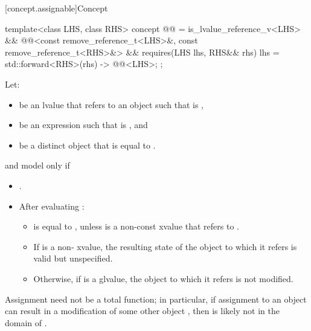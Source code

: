 [concept.assignable]{Concept }

\begin{itemdecl}
template<class LHS, class RHS>
  concept @@ =
    is_lvalue_reference_v<LHS> &&
    @@<const remove_reference_t<LHS>&, const remove_reference_t<RHS>&> &&
    requires(LHS lhs, RHS&& rhs) {
      { lhs = std::forward<RHS>(rhs) } -> @@<LHS>;
    };
\end{itemdecl}

\begin{itemdescr}
\pnum
Let:
\begin{itemize}
\item {} be an lvalue that refers to an object  such that
   is ,
\item {} be an expression such that  is
  , and
\item {} be a distinct object that is equal to .
\end{itemize}
 and  model
 only if
\begin{itemize}
\item {}.

\item After evaluating :
\begin{itemize}
\item {} is equal to , unless  is a non-const
xvalue that refers to .

\item If  is a non- xvalue, the resulting state of the
object to which it refers is valid but unspecified.

\item Otherwise, if  is a glvalue, the object to which it refers is
  not modified.
\end{itemize}
\end{itemize}

\pnum
\begin{note}
Assignment need not be a total function;
in particular, if assignment to an object  can result in a modification
of some other object , then  is likely not in the domain
of \tcode{=}.
\end{note}
\end{itemdescr}

